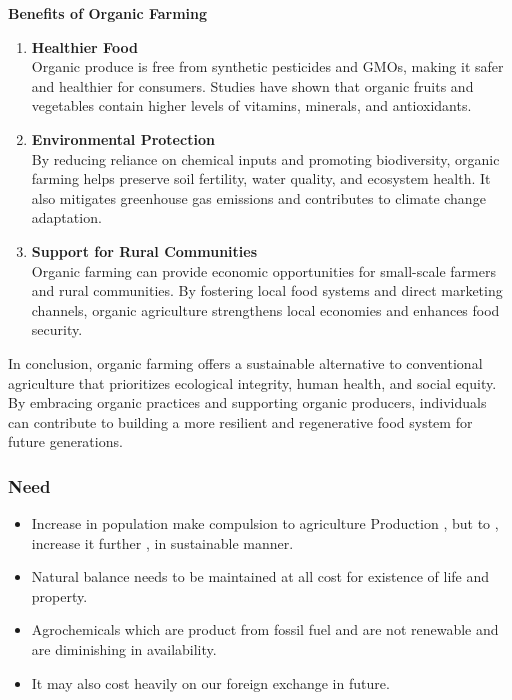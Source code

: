 \documentclass[12pt]{article}
\begin{document}
	\noindent \textbf{Benefits of Organic Farming}
	\begin{enumerate}[label=\textbf{\arabic*.}]
		\item \textbf{Healthier Food} \\
		Organic produce is free from synthetic pesticides and GMOs, making it safer and healthier for consumers. Studies have shown that organic fruits and vegetables contain higher levels of vitamins, minerals, and antioxidants.

		\item \textbf{Environmental Protection} \\
		By reducing reliance on chemical inputs and promoting biodiversity, organic farming helps preserve soil fertility, water quality, and ecosystem health. It also mitigates greenhouse gas emissions and contributes to climate change adaptation.

		\item \textbf{Support for Rural Communities} \\
		Organic farming can provide economic opportunities for small-scale farmers and rural communities. By fostering local food systems and direct marketing channels, organic agriculture strengthens local economies and enhances food security.
	\end{enumerate}

	\par In conclusion, organic farming offers a sustainable alternative to conventional agriculture that prioritizes ecological integrity, human health, and social equity. By embracing organic practices and supporting organic producers, individuals can contribute to building a more resilient and regenerative food system for future generations.  \newpage

	\subsubsection{Need}
	\begin{itemize}
		\item Increase in population make compulsion to agriculture Production , but to , increase it further , in sustainable manner.
		\item Natural balance needs to be maintained at all cost for existence of life and property.
		\item Agrochemicals which are product from fossil fuel and are not renewable and are diminishing in availability.
		\item It may also cost heavily on our foreign exchange in future.
	\end{itemize}
\end{document}
